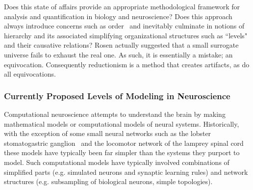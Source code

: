 \documentclass[10pt,letterpaper]{article}
\begin{document}
Does this state of affairs provide an appropriate methodological framework for analysis and quantification in biology and neuroscience?
Does this approach always introduce concerns such as order~\cite{jacobson93} and inevitably culminate in notions of hierarchy and its associated simplifying organizational structures such as ``levels" and their causative relations?
Rosen actually suggested that a small surrogate universe fails to exhaust the real one. As such, it is essentially a mistake; an equivocation.  Consequently reductionism is a method that creates artifacts, as do all equivocations.


\subsubsection*{Currently Proposed Levels of Modeling in Neuroscience}

Computational neuroscience attempts to understand the brain by making mathematical models or computational models of neural systems. Historically, with the exception of some small neural networks such as the lobster stomatogastric ganglion~\cite{nusbaum02} and the locomotor network of the lamprey spinal cord~\cite{kozlov07} these models have typically been far simpler than the systems they purport to model. Such computational models have typically involved combinations of simplified parts (e.g. simulated neurons and synaptic learning rules) and network structures (e.g. subsampling of biological neurons, simple topologies).
\end{document}
